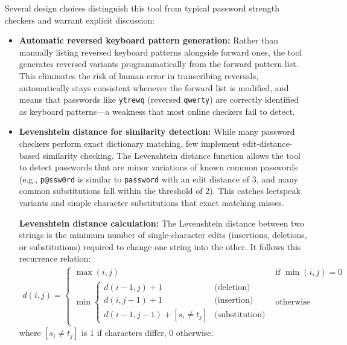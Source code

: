 Several design choices distinguish this tool from typical password strength checkers and warrant explicit discussion:

\begin{itemize}
    \item \textbf{Automatic reversed keyboard pattern generation:} Rather than manually listing reversed keyboard patterns alongside forward ones, the tool generates reversed variants programmatically from the forward pattern list. This eliminates the risk of human error in transcribing reversals, automatically stays consistent whenever the forward list is modified, and means that passwords like \texttt{ytrewq} (reversed \texttt{qwerty}) are correctly identified as keyboard patterns---a weakness that most online checkers fail to detect.

    \item \textbf{Levenshtein distance for similarity detection:} While many password checkers perform exact dictionary matching, few implement edit-distance-based similarity checking. The Levenshtein distance function allows the tool to detect passwords that are minor variations of known common passwords (e.g., \texttt{p@ssw0rd} is similar to \texttt{password} with an edit distance of 3, and many common substitutions fall within the threshold of 2). This catches leetspeak variants and simple character substitutions that exact matching misses.

\textbf{Levenshtein distance calculation:}
The Levenshtein distance between two strings is the minimum number of single-character edits (insertions, deletions, or substitutions) required to change one string into the other. It follows this recurrence relation:
\begin{align*}
    d(i,j) = \begin{cases}
        \max(i,j) & \text{if } \min(i,j) = 0 \\
        \min \begin{cases}
            d(i-1,j) + 1 & \text{(deletion)} \\
            d(i,j-1) + 1 & \text{(insertion)} \\
            d(i-1,j-1) + [s_i \neq t_j] & \text{(substitution)}
        \end{cases} & \text{otherwise}
    \end{cases}
\end{align*}
where $[s_i \neq t_j]$ is 1 if characters differ, 0 otherwise.


\end{itemize}
